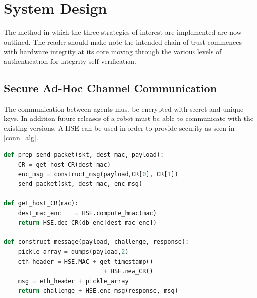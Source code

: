 \documentclass[conference]{IEEEtran}
\begin{document}
\section{System Design} \label{sec:Methodology}

The method in which the three strategies of interest are implemented are now outlined. The reader should make note the intended chain of trust commences with hardware integrity at its core moving through the various levels of authentication for integrity self-verification.

\subsection{Secure Ad-Hoc Channel Communication}

The communication between agents must be encrypted with secret and unique keys. In addition future releases of a robot must be able to communicate with the existing versions. A HSE can be used in order to provide security as seen in \autoref{conn_alg}.

\begin{lstlisting}[language=Python, frame=single, columns=flexible, label=conn_alg,caption={Algorithm used to compose encrypted payload}]
def prep_send_packet(skt, dest_mac, payload):
	CR = get_host_CR(dest_mac)
	enc_msg = construct_msg(payload,CR[0], CR[1])
	send_packet(skt, dest_mac, enc_msg)
	
def get_host_CR(mac):
	dest_mac_enc	= HSE.compute_hmac(mac)
	return HSE.dec_CR(db_enc[dest_mac_enc])
	
def construct_message(payload, challenge, response):
	pickle_array = dumps(payload,2)
	eth_header = HSE.MAC + get_timestamp() 
	                        + HSE.new_CR()
	msg = eth_header + pickle_array
	return challenge + HSE.enc_msg(response, msg)
\end{lstlisting}
\end{document}
